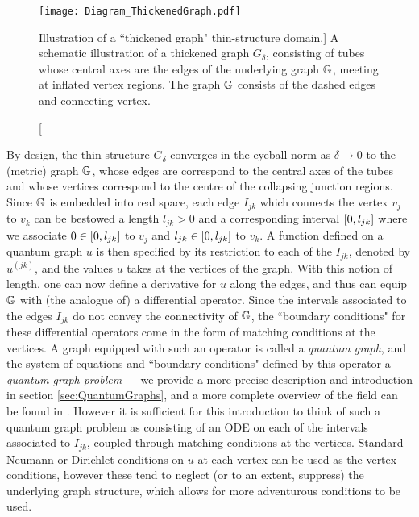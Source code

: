 \begin{figure}[t]
	\centering
	\texttt{[image: Diagram\_ThickenedGraph.pdf]}
	\caption[Illustration of a ``thickened graph" thin-structure domain.]{\label{fig:Diagram_ThickenedGraph} A schematic illustration of a thickened graph $G_{\delta}$, consisting of tubes whose central axes are the edges of the underlying graph $\mathbb{G}$, meeting at inflated vertex regions. The graph $\mathbb{G}$ consists of the dashed edges and connecting vertex. }
\end{figure}

By design, the thin-structure $G_{\delta}$ converges in the eyeball norm as $\delta\rightarrow0$ to the (metric) graph $\mathbb{G}$, whose edges are correspond to the central axes of the tubes and whose vertices correspond to the centre of the collapsing junction regions.
Since $\mathbb{G}$ is embedded into real space, each edge $I_{jk}$ which connects the vertex $v_j$ to $v_k$ can be bestowed a length $l_{jk}>0$ and a corresponding interval $\left[ 0,l_{jk} \right]$ where we associate $0\in\left[ 0,l_{jk} \right]$ to $v_j$ and $l_{jk}\in\left[ 0,l_{jk} \right]$ to $v_k$.
A function defined on a quantum graph $u$ is then specified by its restriction to each of the $I_{jk}$, denoted by $u^{(jk)}$, and the values $u$ takes at the vertices of the graph.
With this notion of length, one can now define a derivative for $u$ along the edges, and thus can equip $\mathbb{G}$ with (the analogue of) a differential operator.
Since the intervals associated to the edges $I_{jk}$ do not convey the connectivity of $\mathbb{G}$, the ``boundary conditions" for these differential operators come in the form of matching conditions at the vertices.
A graph equipped with such an operator is called a \emph{quantum graph}, and the system of equations and ``boundary conditions" defined by this operator a \emph{quantum graph problem} --- we provide a more precise description and introduction in section \ref{sec:QuantumGraphs}, and a more complete overview of the field can be found in \cite{berkolaiko2013introduction}.
However it is sufficient for this introduction to think of such a quantum graph problem as consisting of an ODE on each of the intervals associated to $I_{jk}$, coupled through matching conditions at the vertices.
Standard Neumann or Dirichlet conditions on $u$ at each vertex can be used as the vertex conditions, however these tend to neglect (or to an extent, suppress) the underlying graph structure, which allows for more adventurous conditions to be used.
